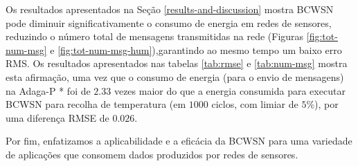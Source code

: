 \documentclass{acm_proc_article-sp}
\begin{document}
Os resultados apresentados na Seção \ref{results-and-discussion} mostra 
BCWSN pode diminuir significativamente o consumo de energia em redes de
sensores, reduzindo o número total de mensagens transmitidas na rede (Figuras
\ref{fig:tot-num-msg} e \ref{fig:tot-num-msg-hum}),garantindo ao mesmo
tempo um baixo erro RMS. Os resultados apresentados nas tabelas \ref{tab:rmse} 
e \ref{tab:num-msg} mostra esta afirmação, uma vez que o consumo de 
energia (para o envio de mensagens) na Adaga-P * foi de $2.33$ vezes maior do
que a energia consumida  para executar BCWSN para recolha de temperatura 
(em $1000$ ciclos, com limiar de $5\%$), por uma diferença RMSE de $0.026$.
\vspace*{-.6cm}

Por fim, enfatizamos a aplicabilidade e a eficácia da BCWSN para uma variedade de aplicações que
consomem dados produzidos por redes de sensores.
\vspace*{-.3cm}





  
\end{document}

